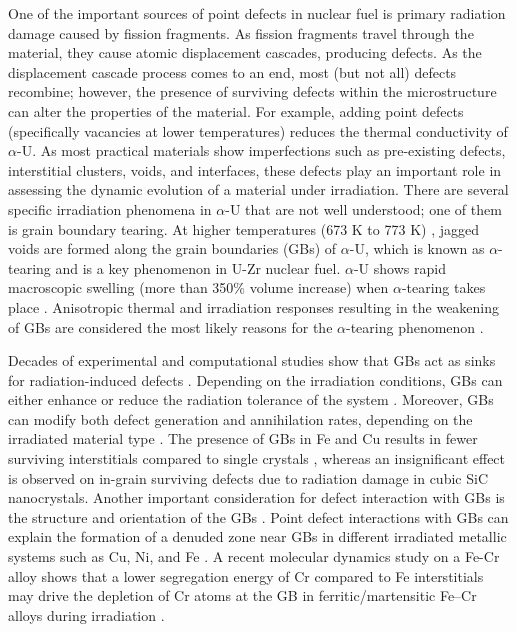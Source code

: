 \documentclass[review]{elsarticle}
\begin{document}
\par One of the important sources of point defects in nuclear fuel is primary radiation damage caused by fission fragments. As fission fragments travel through the material, they cause atomic displacement cascades, producing defects.  As the displacement cascade process comes to an end, most (but not all) defects recombine; however, the presence of surviving defects within the microstructure can alter the properties of the material. For example, adding point defects (specifically vacancies at lower temperatures) reduces the thermal conductivity of $\alpha$-U\cite{thermal_alpha}. As most practical materials show imperfections such as pre-existing defects, interstitial clusters, voids, and interfaces, these defects play an important role in assessing the dynamic evolution of a material under irradiation. There are several specific irradiation phenomena in $\alpha$-U that are not well understood; one of them is grain boundary tearing. At higher temperatures (673 K to 773 K) \cite{1964_AngermanandCaskey}, jagged voids are formed along the grain boundaries (GBs) of $\alpha$-U, which is known as $\alpha$-tearing and is a key phenomenon in U-Zr nuclear fuel. $\alpha$-U shows rapid macroscopic swelling (more than 350\% volume increase) when $\alpha$-tearing takes place \cite{ma15124106}. Anisotropic thermal and irradiation responses resulting in the weakening of GBs are considered the most likely reasons for the $\alpha$-tearing phenomenon \cite{leggett_report, 2020_Rez, 2020_JOKISAARI}.


\par Decades of experimental and computational studies show that GBs act as sinks for radiation-induced defects \cite{NORDLUND2018450, SWAMINATHAN20102843_SiC_GB_radiation, osti_1616821, stoller}. Depending on the irradiation conditions, GBs can either enhance or reduce the radiation tolerance of the system \cite{bai_cu_inter}. Moreover, GBs can modify both defect generation and annihilation rates, depending on the irradiated material type \cite{bai_cu_inter, chao}. The presence of GBs in Fe and Cu results in fewer surviving interstitials compared to single crystals \cite{Tungsten, ZHANG2020100726}, whereas an insignificant effect is observed on in-grain surviving defects due to radiation damage in cubic SiC nanocrystals\cite{SWAMINATHAN20102843_SiC_GB_radiation}. Another important consideration for defect interaction with GBs is the structure and orientation of the GBs \cite{bai_cu_inter, Uberuaga_2013_MgO, Tungsten}. Point defect interactions with GBs can explain the formation of a denuded zone near GBs in different irradiated metallic systems such as Cu, Ni, and Fe \cite{Uberuaga2015, ma9020105_Void_denuded_zone}. A recent molecular dynamics study on a Fe-Cr alloy shows that a lower segregation energy of Cr compared to Fe interstitials may drive the depletion of Cr atoms at the GB in ferritic/martensitic Fe–Cr alloys during irradiation \cite{ZHANG2020100726}. 
\end{document}
